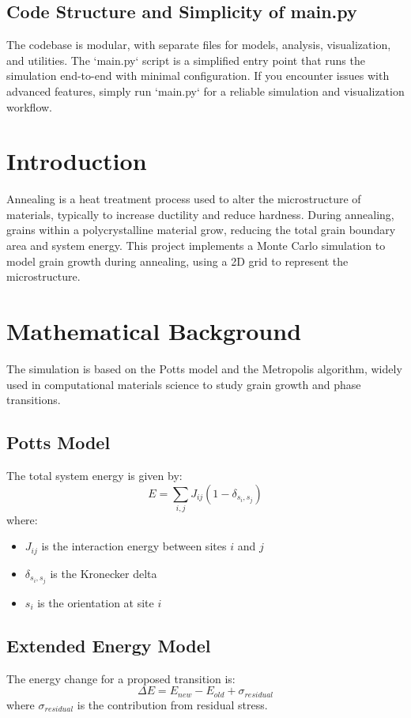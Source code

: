 \documentclass[12pt]{article}
\begin{document}
\subsection{Code Structure and Simplicity of main.py}
The codebase is modular, with separate files for models, analysis, visualization, and utilities. The `main.py` script is a simplified entry point that runs the simulation end-to-end with minimal configuration. If you encounter issues with advanced features, simply run `main.py` for a reliable simulation and visualization workflow.

\section{Introduction}
Annealing is a heat treatment process used to alter the microstructure of materials, typically to increase ductility and reduce hardness. During annealing, grains within a polycrystalline material grow, reducing the total grain boundary area and system energy. This project implements a Monte Carlo simulation to model grain growth during annealing, using a 2D grid to represent the microstructure.

\section{Mathematical Background}
The simulation is based on the Potts model and the Metropolis algorithm, widely used in computational materials science to study grain growth and phase transitions.

\subsection{Potts Model}
The total system energy is given by:
\[
E = \sum_{i,j} J_{ij}(1 - \delta_{s_i,s_j})
\]
where:
\begin{itemize}
    \item $J_{ij}$ is the interaction energy between sites $i$ and $j$
    \item $\delta_{s_i,s_j}$ is the Kronecker delta
    \item $s_i$ is the orientation at site $i$
\end{itemize}

\subsection{Extended Energy Model}
The energy change for a proposed transition is:
\[
\Delta E = E_{new} - E_{old} + \sigma_{residual}
\]
where $\sigma_{residual}$ is the contribution from residual stress.
\end{document}
